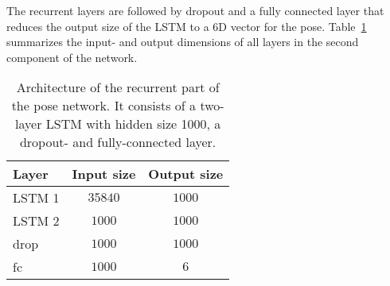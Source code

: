 			The recurrent layers are followed by dropout and a fully connected layer that reduces the output size of the LSTM to a 6D vector for the pose.
			Table~\ref{tbl:lstm_and_fc_after_flownet} summarizes the input- and output dimensions of all layers in the second component of the network.
			\begin{table}[tb]
				\small
				\begin{center}
					\begin{tabular}{lcc}
						\toprule
						Layer 		& Input size 					& Output size			\\
						\midrule
						LSTM 1 		& $35840$						& $1000$  				\\
						LSTM 2 		& $1000$						& $1000$ 				\\
						drop		& $1000$						& $1000$				\\
						fc 			& $1000$						& $6$					\\
						\bottomrule
					\end{tabular}
				\end{center}
				\caption[Architecture of the recurrent part of the pose network]
						{Architecture of the recurrent part of the pose network.
						 It consists of a two-layer LSTM with hidden size 1000, a dropout- and fully-connected layer.
						 }
				\label{tbl:lstm_and_fc_after_flownet}
			\end{table}
		
